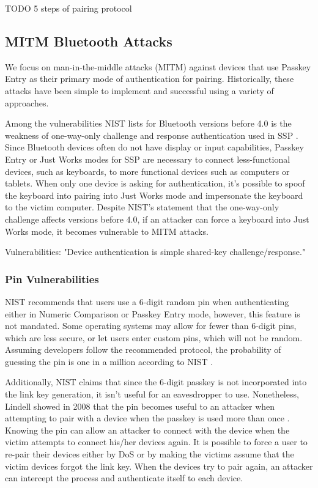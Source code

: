 \documentclass{acm_proc_article-sp}
\begin{document}
TODO 5 steps of pairing protocol


\subsection{MITM Bluetooth Attacks}
We focus on man-in-the-middle attacks (MITM) against devices that use Passkey Entry as their primary mode of authentication for pairing. Historically, these attacks have been simple to implement and successful using a variety of approaches.  

Among the vulnerabilities NIST lists for Bluetooth versions before 4.0 is the weakness of one-way-only challenge and response authentication used in SSP \cite{scarfone2008guide}. 
Since Bluetooth devices often do not have display or input capabilities, Passkey Entry or Just Works modes for SSP are necessary to connect less-functional devices, such as keyboards, to more functional devices such as computers or tablets. When only one device is asking for authentication, it's possible to spoof the keyboard into pairing into Just Works mode and impersonate the keyboard to the victim computer. Despite NIST's statement that the one-way-only challenge affects versions before 4.0, if an attacker can force a keyboard into Just Works mode, it becomes vulnerable to MITM attacks.


Vulnerabilities: 
"Device authentication is simple shared-key challenge/response." \cite{scarfone2008guide}



\subsubsection{Pin Vulnerabilities}
NIST recommends that users use a 6-digit random pin when authenticating either in Numeric Comparison or Passkey Entry mode, however, this feature is not mandated. Some operating systems may allow for fewer than 6-digit pins, which are less secure, or let users enter custom pins, which will not be random. Assuming developers follow the recommended protocol, the probability of guessing the pin is one in a million according to NIST \cite{scarfone2008guide}. 

Additionally, NIST claims that since the 6-digit passkey is not incorporated into the link key generation, it isn't useful for an eavesdropper to use. Nonetheless, Lindell showed in 2008 that the pin becomes useful to an attacker when attempting to pair with a device when the passkey is used more than once \cite{lindell2008attacks}. Knowing the pin can allow an attacker to connect with the device when the victim attempts to connect his/her devices again. It is possible to force a user to re-pair their devices either by DoS \cite{cuthbertbluetooth} or by making the victims assume that the victim devices forgot the link key\cite{shaked2005cracking}. When the devices try to pair again, an attacker can intercept the process and authenticate itself to each device. 
\end{document}
